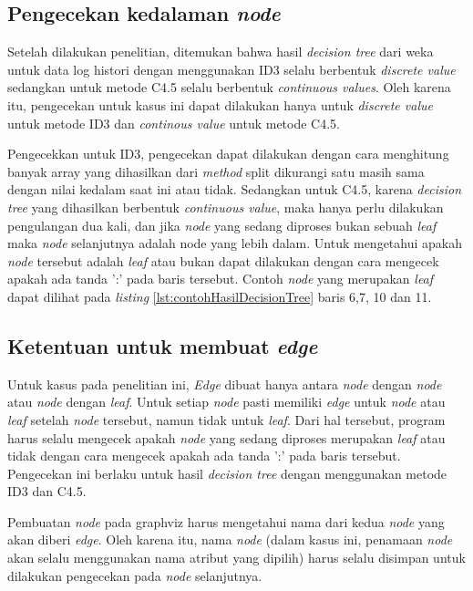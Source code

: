 \subsection{Pengecekan kedalaman \textsl{node}}

Setelah dilakukan penelitian, ditemukan bahwa hasil \textsl{decision tree} dari weka untuk data log histori dengan menggunakan ID3 selalu berbentuk \textsl{discrete value} sedangkan untuk metode C4.5 selalu berbentuk \textsl{continuous values}. Oleh karena itu, pengecekan untuk kasus ini dapat dilakukan hanya untuk \textsl{discrete value} untuk metode ID3 dan \textsl{continous value} untuk metode C4.5.

Pengecekkan untuk ID3, pengecekan dapat dilakukan dengan cara menghitung banyak array yang dihasilkan dari \textsl{method} split dikurangi satu masih sama dengan nilai kedalam saat ini atau tidak. Sedangkan untuk C4.5, karena \textsl{decision tree} yang dihasilkan berbentuk \textsl{continuous value}, maka hanya perlu dilakukan pengulangan dua kali, dan jika \textsl{node} yang sedang diproses bukan sebuah \textsl{leaf} maka \textsl{node} selanjutnya adalah node yang lebih dalam. Untuk mengetahui apakah \textsl{node} tersebut adalah \textsl{leaf} atau bukan dapat dilakukan dengan cara mengecek apakah ada tanda ':' pada baris tersebut. Contoh \textsl{node} yang merupakan \textsl{leaf} dapat dilihat pada \textsl{listing} \ref{lst:contohHasilDecisionTree} baris 6,7, 10 dan 11.

\subsection{Ketentuan untuk membuat \textsl{edge}}

Untuk kasus pada penelitian ini, \textsl{Edge} dibuat hanya antara \textsl{node} dengan \textsl{node} atau \textsl{node} dengan \textsl{leaf}. Untuk setiap \textsl{node} pasti memiliki \textsl{edge} untuk \textsl{node} atau \textsl{leaf} setelah \textsl{node} tersebut, namun tidak untuk \textsl{leaf}. Dari hal tersebut, program harus selalu mengecek apakah \textsl{node} yang sedang diproses merupakan \textsl{leaf} atau tidak dengan cara mengecek apakah ada tanda ':' pada baris tersebut. Pengecekan ini berlaku untuk hasil \textsl{decision tree} dengan menggunakan metode ID3 dan C4.5.

Pembuatan \textsl{node} pada graphviz harus mengetahui nama dari kedua \textsl{node} yang akan diberi \textsl{edge}. Oleh karena itu, nama \textsl{node} (dalam kasus ini, penamaan \textsl{node} akan selalu menggunakan nama atribut yang dipilih) harus selalu disimpan untuk dilakukan pengecekan pada \textsl{node} selanjutnya. 

